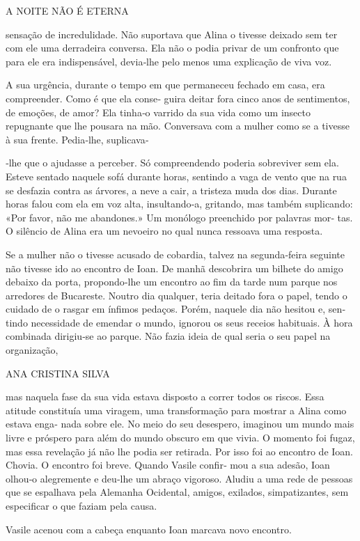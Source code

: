 A NOITE NÃO É ETERNA

sensação de incredulidade. Não suportava que Alina o tivesse deixado sem
ter com ele uma derradeira conversa. Ela não o podia privar de um
confronto que para ele era indispensável, devia‑lhe pelo menos uma
explicação de viva voz.

A sua urgência, durante o tempo em que permaneceu fechado em casa, era
compreender. Como é que ela conse‑ guira deitar fora cinco anos de
sentimentos, de emoções, de amor? Ela tinha‑o varrido da sua vida como
um insecto repugnante que lhe pousara na mão. Conversava com a mulher
como se a tivesse à sua frente. Pedia‑lhe, suplicava‑

‑lhe que o ajudasse a perceber. Só compreendendo poderia sobreviver sem
ela. Esteve sentado naquele sofá durante horas, sentindo a vaga de vento
que na rua se desfazia contra as árvores, a neve a cair, a tristeza muda
dos dias. Durante horas falou com ela em voz alta, insultando‑a,
gritando, mas também suplicando: «Por favor, não me abandones.» Um
monólogo preenchido por palavras mor‑ tas. O silêncio de Alina era um
nevoeiro no qual nunca ressoava uma resposta.

Se a mulher não o tivesse acusado de cobardia, talvez na segunda‑feira
seguinte não tivesse ido ao encontro de Ioan. De manhã descobrira um
bilhete do amigo debaixo da porta, propondo‑lhe um encontro ao fim da
tarde num parque nos arredores de Bucareste. Noutro dia qualquer, teria
deitado fora o papel, tendo o cuidado de o rasgar em ínfimos pedaços.
Porém, naquele dia não hesitou e, sen‑ tindo necessidade de emendar o
mundo, ignorou os seus receios habituais. À hora combinada dirigiu‑se ao
parque. Não fazia ideia de qual seria o seu papel na organização,

ANA CRISTINA SILVA

mas naquela fase da sua vida estava disposto a correr todos os riscos.
Essa atitude constituía uma viragem, uma transformação para mostrar a
Alina como estava enga‑ nada sobre ele. No meio do seu desespero,
imaginou um mundo mais livre e próspero para além do mundo obscuro em
que vivia. O momento foi fugaz, mas essa revelação já não lhe podia ser
retirada. Por isso foi ao encontro de Ioan. Chovia. O encontro foi
breve. Quando Vasile confir‑ mou a sua adesão, Ioan olhou‑o alegremente
e deu‑lhe um abraço vigoroso. Aludiu a uma rede de pessoas que se
espalhava pela Alemanha Ocidental, amigos, exilados, simpatizantes, sem
especificar o que faziam pela causa.

Vasile acenou com a cabeça enquanto Ioan marcava novo encontro.

